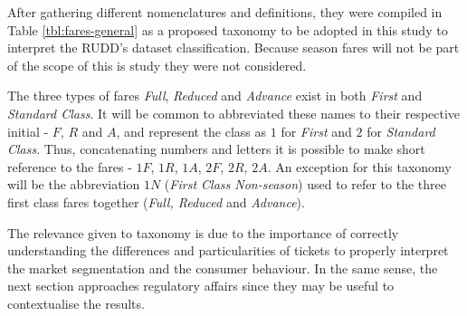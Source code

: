 
% 

After gathering different nomenclatures and definitions, they were compiled in Table \ref{tbl:fares-general} as a proposed taxonomy to be adopted in this study to interpret the RUDD's dataset classification. Because season fares will not be part of the scope of this is study they were not considered.



The three types of fares \textit{Full}, \textit{Reduced} and \textit{Advance} exist in both \textit{First} and \textit{Standard Class}. It will be common to abbreviated these names to their respective initial - $F$, $R$ and $A$, and represent the class as $1$ for \textit{First} and $2$ for \textit{Standard Class}. Thus, concatenating numbers and letters it is possible to make short reference to the fares - $1F$, $1R$, $1A$, $2F$, $2R$, $2A$. An exception for this taxonomy will be the abbreviation $1N$ (\textit{First Class Non-season}) used to refer to the three first class fares together (\textit{Full, Reduced} and \textit{Advance}).

The relevance given to taxonomy is due to the importance of correctly understanding the differences and particularities of tickets to properly interpret the market segmentation and the consumer behaviour. In the same sense, the next section approaches regulatory affairs since they may be useful to contextualise the results.




